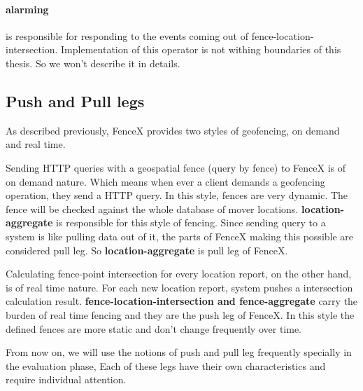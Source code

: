\documentclass[a4]{report}
\begin{document}
    \paragraph{alarming} is responsible for responding to the events coming out of fence-location-intersection.
    Implementation of this operator is not withing boundaries of this thesis.
    So we won't describe it in details.

    \subsection{Push and Pull legs}
    As described previously, FenceX provides two styles of geofencing, on demand and real time.

    Sending HTTP queries with a geospatial fence (query by fence) to FenceX is of on demand nature.
    Which means when ever a client demands a geofencing operation, they send a HTTP query.
    In this style, fences are very dynamic.
    The fence will be checked against the whole database of mover locations.
    \textbf{location-aggregate} is responsible for this style of fencing.
    Since sending query to a system is like pulling data out of it, the parts of FenceX making this possible are
    considered pull leg.
    So \textbf{location-aggregate} is pull leg of FenceX.

    Calculating fence-point intersection for every location report, on the other hand, is of real time nature.
    For each new location report, system pushes a intersection calculation result.
    \textbf{fence-location-intersection and fence-aggregate} carry the burden of real time fencing and they are the
    push leg of FenceX.
    In this style the defined fences are more static and don't change frequently over time.

    From now on, we will use the notions of push and pull leg frequently specially in the evaluation phase, Each of
    these legs have their own characteristics and require individual attention.
\end{document}
